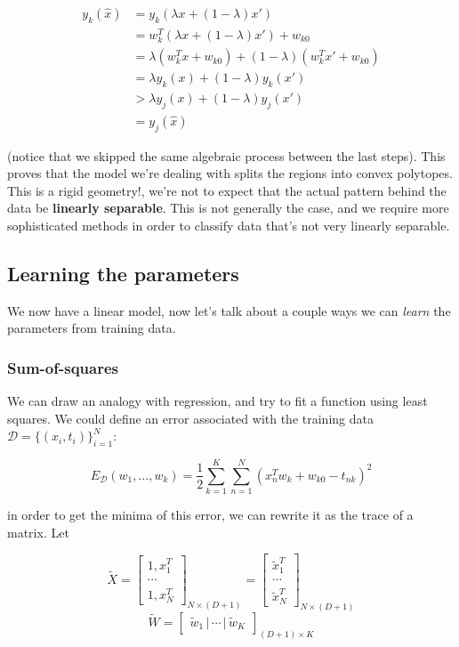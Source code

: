 \documentclass{report}
\begin{document}
\begin{align*}
 	y_k(\hat{x}) &= y_k(\lambda x + (1-\lambda)x')\\
 	&= w_k^T(\lambda x + (1-\lambda)x') + w_{k0}\\
 	&= \lambda(w_k^T x + w_{k0}) + (1-\lambda)(w_k^Tx' + w_{k0})\\
 	&= \lambda y_k(x) + (1-\lambda)y_k(x')\\
 	&> \lambda y_j(x) + (1-\lambda)y_j(x')\\
 	&= y_j(\hat{x})
 \end{align*}

(notice that we skipped the same algebraic process between the last steps). This proves that the model we're dealing with splits the regions into convex polytopes. This is a rigid geometry!, we're not to expect that the actual pattern behind the data be \textbf{linearly separable}. This is not generally the case, and we require more sophisticated methods in order to classify data that's not very linearly separable.

\subsection{Learning the parameters}

We now have a linear model, now let's talk about a couple ways we can \textit{learn} the parameters from training data.

\subsubsection{Sum-of-squares}

We can draw an analogy with regression, and try to fit a function using least squares. We could define an error associated with the training data $\mathcal{D} = \{(x_i, t_i)\}_{i=1}^N$:

\[E_\mathcal{D}(w_1,\dots,w_k) = \frac{1}{2}\sum_{k = 1}^K\sum_{n=1}^N(x_n^Tw_k + w_{k0} - t_{nk})^2\]

in order to get the minima of this error, we can rewrite it as the trace of a matrix. Let

\[\widetilde{X} = \begin{bmatrix}
	1, x_1^T\\
	\cdots\\
	1, x_N^T
\end{bmatrix}_{N\times(D+1)} = \begin{bmatrix}
	\widetilde{x}_1^T\\
	\cdots\\
	\widetilde{x}_N^T
\end{bmatrix}_{N\times(D+1)}\]
\[\widetilde{W} = \begin{bmatrix}
	\widetilde{w}_{1}\,|\,\cdots\,|\,\widetilde{w}_K
\end{bmatrix}_{(D+1)\times K}\]
\end{document}
